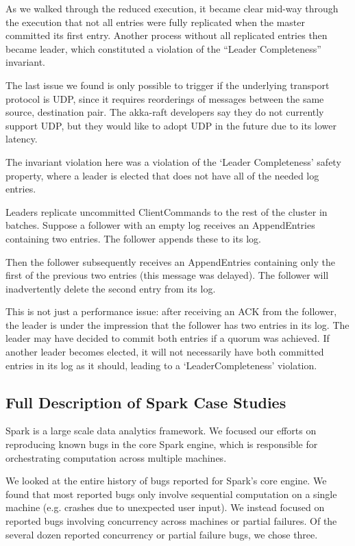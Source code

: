 As we walked through the reduced execution, it
became clear mid-way through the execution that not all
entries were fully replicated when the master committed
its first entry. Another process without all replicated entries
then became leader, which constituted a violation
of the ``Leader Completeness'' invariant.

 The last issue we found is only possible to
 trigger if the underlying transport protocol is UDP, since it requires reorderings of messages between the same source, destination pair.
 The akka-raft developers say they do not currently support UDP, but they
 would like to adopt UDP in the future due to its lower latency.

The invariant violation here was a violation of the `Leader Completeness' safety property,
 where a leader is elected that does not have all of the needed log entries.

Leaders replicate uncommitted ClientCommands to the rest of the cluster in batches. Suppose a follower with an empty log receives an AppendEntries containing two entries. The follower appends these to its log.

Then the follower subsequently receives an AppendEntries containing only the first of the previous two entries (this message was delayed). The follower will inadvertently delete the second entry from its log.

This is not just a performance issue: after receiving an ACK from the follower, the leader is under the
 impression that the follower has two entries in its log.
 The leader may have decided to commit both entries if a quorum was achieved.
 If another leader becomes elected, it will not necessarily have both
 committed entries in its log as it should, leading to a `LeaderCompleteness'
 violation.


\subsection{Full Description of Spark Case Studies}
\label{app:spark_case_studies}

Spark is a large scale data analytics framework. We focused our efforts on
reproducing known bugs in the core Spark engine, which is responsible for
orchestrating computation across multiple machines.

We looked at the entire history of bugs reported for Spark's core engine. We found that most reported bugs only involve sequential
computation on a single machine (e.g. crashes due to unexpected user input).
We instead focused on reported bugs involving concurrency across machines or
partial failures. Of the several dozen reported concurrency or partial failure
bugs, we chose three.


